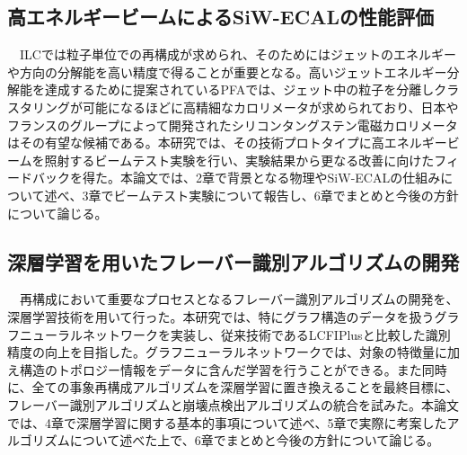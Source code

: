 \subsection{高エネルギービームによるSiW-ECALの性能評価}
　ILCでは粒子単位での再構成が求められ、そのためにはジェットのエネルギーや方向の分解能を高い精度で得ることが重要となる。高いジェットエネルギー分解能を達成するために提案されているPFAでは、ジェット中の粒子を分離しクラスタリングが可能になるほどに高精細なカロリメータが求められており、日本やフランスのグループによって開発されたシリコンタングステン電磁カロリメータはその有望な候補である。本研究では、その技術プロトタイプに高エネルギービームを照射するビームテスト実験を行い、実験結果から更なる改善に向けたフィードバックを得た。本論文では、2章で背景となる物理やSiW-ECALの仕組みについて述べ、3章でビームテスト実験について報告し、6章でまとめと今後の方針について論じる。\\
\subsection{深層学習を用いたフレーバー識別アルゴリズムの開発}
　再構成において重要なプロセスとなるフレーバー識別アルゴリズムの開発を、深層学習技術を用いて行った。本研究では、特にグラフ構造のデータを扱うグラフニューラルネットワークを実装し、従来技術であるLCFIPlusと比較した識別精度の向上を目指した。グラフニューラルネットワークでは、対象の特徴量に加え構造のトポロジー情報をデータに含んだ学習を行うことができる。また同時に、全ての事象再構成アルゴリズムを深層学習に置き換えることを最終目標に、フレーバー識別アルゴリズムと崩壊点検出アルゴリズムの統合を試みた。本論文では、4章で深層学習に関する基本的事項について述べ、5章で実際に考案したアルゴリズムについて述べた上で、6章でまとめと今後の方針について論じる。